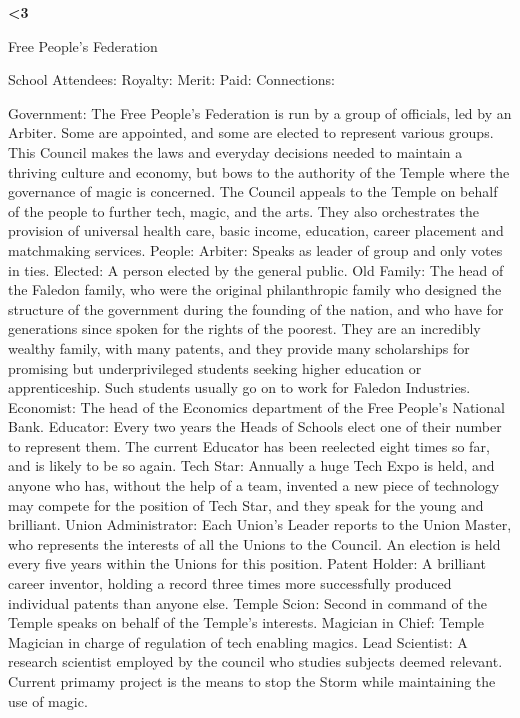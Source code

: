 \documentclass[blue]{GL2020}
\begin{document}
\name{\bTest{}}
\bf{<3}

Free People's Federation %


School Attendees:
	Royalty:
	Merit:
	Paid:
	Connections:

Government:  The Free People's Federation is run by a group of officials, led by an Arbiter. Some are appointed, and some are elected to represent various groups.  This Council makes the laws and everyday decisions needed to maintain a thriving culture and economy, but bows to the authority of the Temple where the governance of magic is concerned.  The Council appeals to the Temple on behalf of the people to further tech, magic, and the arts.  They also orchestrates the provision of universal health care, basic income, education, career placement and matchmaking services.
	People:		Arbiter:	Speaks as leader of group and only votes in ties.
						Elected:	A person elected by the general public. 
						Old Family:	The head of the Faledon family, who were the original philanthropic family who designed the structure of the government during the founding of the nation, and who have for generations since spoken for the rights of the poorest.  They are an incredibly wealthy family, with many patents, and they provide many scholarships for promising but underprivileged students seeking higher education or apprenticeship.  Such students usually go on to work for Faledon Industries.
						Economist:	The head of the Economics department of the Free People's National Bank.
						Educator:		Every two years the Heads of Schools elect one of their number to represent them.  The current Educator has been reelected eight times so far, and is likely to be so again.
						Tech Star:	Annually a huge Tech Expo is held, and anyone who has, without the help of a team, invented a new piece of technology may compete for the position of Tech Star, and they speak for the young and brilliant.
						Union Administrator:	Each Union's Leader reports to the Union Master, who represents the interests of all the Unions to the Council.  An election is held every five years within the Unions for this position.
						Patent Holder:	A brilliant career inventor, holding a record three times more successfully produced individual patents than anyone else.
						Temple Scion:  Second in command of the Temple speaks on behalf of the Temple's interests.
						Magician in Chief:  Temple Magician in charge of regulation of tech enabling magics.
						Lead Scientist:  A research scientist employed by the council who studies subjects deemed relevant.  Current primamy project is the means to stop the Storm while maintaining the use of magic.
	
\end{document}
